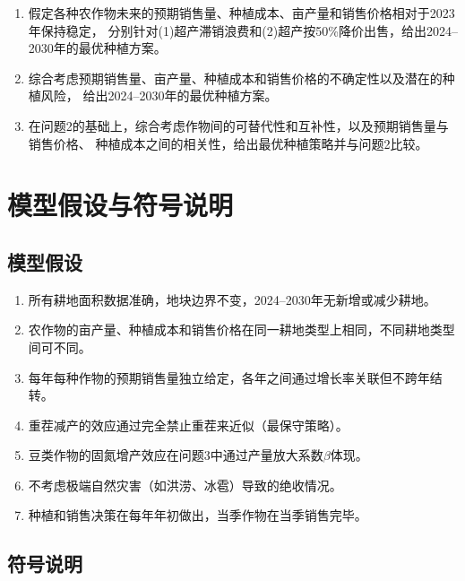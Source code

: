 \documentclass[12pt]{ctexart}
\begin{document}
\begin{enumerate}[label=\textbf{问题\arabic*：}, leftmargin=*]
    \item 假定各种农作物未来的预期销售量、种植成本、亩产量和销售价格相对于2023年保持稳定，
          分别针对(1)超产滞销浪费和(2)超产按50\%降价出售，给出2024--2030年的最优种植方案。
    \item 综合考虑预期销售量、亩产量、种植成本和销售价格的不确定性以及潜在的种植风险，
          给出2024--2030年的最优种植方案。
    \item 在问题2的基础上，综合考虑作物间的可替代性和互补性，以及预期销售量与销售价格、
          种植成本之间的相关性，给出最优种植策略并与问题2比较。
\end{enumerate}

\section{模型假设与符号说明}

\subsection{模型假设}

\begin{enumerate}[label=(\arabic*), leftmargin=*]
    \item 所有耕地面积数据准确，地块边界不变，2024--2030年无新增或减少耕地。
    \item 农作物的亩产量、种植成本和销售价格在同一耕地类型上相同，不同耕地类型间可不同。
    \item 每年每种作物的预期销售量独立给定，各年之间通过增长率关联但不跨年结转。
    \item 重茬减产的效应通过完全禁止重茬来近似（最保守策略）。
    \item 豆类作物的固氮增产效应在问题3中通过产量放大系数$\beta$体现。
    \item 不考虑极端自然灾害（如洪涝、冰雹）导致的绝收情况。
    \item 种植和销售决策在每年年初做出，当季作物在当季销售完毕。
\end{enumerate}

\subsection{符号说明}
\end{document}
